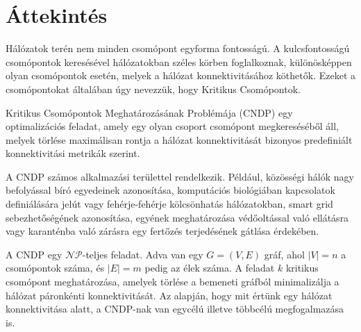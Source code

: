 \section{Áttekintés}\label{sec:ATTEKINTES}

Hálózatok terén nem minden csomópont egyforma fontosságú.
A kulcsfontosságú csomópontok keresésével hálózatokban széles körben foglalkoznak,
különösképpen olyan csomópontok esetén, melyek a hálózat konnektivitásához köthetők.
Ezeket a csomópontokat általában úgy nevezzük, hogy Kritikus Csomópontok.

Kritikus Csomópontok Meghatározásának Problémája (CNDP)
egy optimalizációs feladat, amely egy olyan csoport csomópont
megkereséséből áll, melyek törlése maximálisan rontja a hálózat
konnektivitását bizonyos predefiniált konnektivitási metrikák szerint.

A CNDP számos alkalmazási területtel rendelkezik.
Például, közösségi hálók nagy befolyással bíró egyedeinek azonosítása,
komputációs biológiában kapcsolatok definiálására jelút
vagy fehérje-fehérje kölcsönhatás hálózatokban,
smart grid sebezhetőségének azonosítása, egyének meghatározása
védőoltással való ellátásra vagy karanténba való zárásra egy
fertőzés terjedésének gátlása érdekében.

A CNDP egy $\mathcal{N}\mathcal{P}$-teljes feladat. Adva van egy $G = (V, E)$ gráf, ahol $|V| = n$ a csomópontok száma,
és $|E| = m$ pedig az élek száma. A feladat $k$ kritikus csomópont meghatározása, amelyek törlése a bemeneti
gráfból minimalizálja a hálózat páronkénti konnektivitását. Az alapján, hogy mit értünk egy hálózat
konnektivitása alatt, a CNDP-nak van egycélú illetve többcélú megfogalmazása is.
